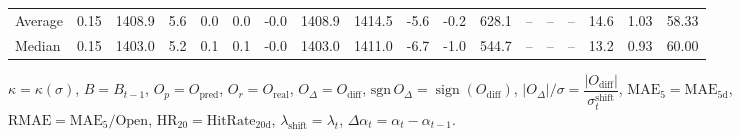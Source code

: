 \begin{threeparttable}
{\begin{tabular}{lrrrrrrrrrrrrrrrrr}
Average &     0.15 & 1408.9 &               5.6 &               0.0 &                0.0 &               -0.0 & 1408.9 & 1414.5 &       -5.6 &                     -0.2 &               628.1 &         -- &        -- &             -- &             14.6 &            1.03 &                  58.33 \\
 Median &     0.15 & 1403.0 &               5.2 &               0.1 &                0.1 &               -0.0 & 1403.0 & 1411.0 &       -6.7 &                     -1.0 &               544.7 &         -- &        -- &             -- &             13.2 &            0.93 &                  60.00 \\
\bottomrule
\end{tabular}
}
\begin{tablenotes}\footnotesize
\item $\kappa=\kappa(\sigma)$, $B=B_{t-1}$, $O_p=O_{\text{pred}}$, $O_r=O_{\text{real}}$, $O_\Delta=O_{\text{diff}}$, $\mathrm{sgn}\,O_\Delta=\operatorname{sign}(O_{\text{diff}})$, $|O_\Delta|/\sigma=\dfrac{|O_{\text{diff}}|}{\sigma_t^{\text{shift}}}$, $\mathrm{MAE}_5=\mathrm{MAE}_{5\text{d}}$, $\mathrm{RMAE}= \mathrm{MAE}_5 / \text{Open}$, $\mathrm{HR}_{20}=\mathrm{HitRate}_{20\text{d}}$, 
$\lambda_{\text{shift}}=\lambda_t$, 
$\Delta\alpha_t=\alpha_t-\alpha_{t-1}$.
\end{tablenotes}
\end{threeparttable}
\endgroup

